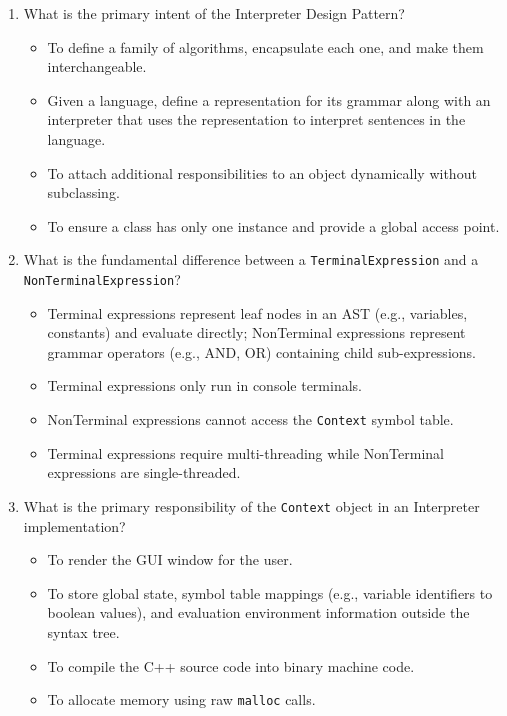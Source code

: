 \documentclass[12pt,a4paper]{article}
\begin{document}
\begin{enumerate}
    \item What is the primary intent of the Interpreter Design Pattern?
    \begin{itemize}
        \item[A)] To define a family of algorithms, encapsulate each one, and make them interchangeable.
        \item[B)] Given a language, define a representation for its grammar along with an interpreter that uses the representation to interpret sentences in the language.
        \item[C)] To attach additional responsibilities to an object dynamically without subclassing.
        \item[D)] To ensure a class has only one instance and provide a global access point.
    \end{itemize}

    \item What is the fundamental difference between a \texttt{TerminalExpression} and a \texttt{NonTerminalExpression}?
    \begin{itemize}
        \item[A)] Terminal expressions represent leaf nodes in an AST (e.g., variables, constants) and evaluate directly; NonTerminal expressions represent grammar operators (e.g., AND, OR) containing child sub-expressions.
        \item[B)] Terminal expressions only run in console terminals.
        \item[C)] NonTerminal expressions cannot access the \texttt{Context} symbol table.
        \item[D)] Terminal expressions require multi-threading while NonTerminal expressions are single-threaded.
    \end{itemize}

    \item What is the primary responsibility of the \texttt{Context} object in an Interpreter implementation?
    \begin{itemize}
        \item[A)] To render the GUI window for the user.
        \item[B)] To store global state, symbol table mappings (e.g., variable identifiers to boolean values), and evaluation environment information outside the syntax tree.
        \item[C)] To compile the C++ source code into binary machine code.
        \item[D)] To allocate memory using raw \texttt{malloc} calls.
    \end{itemize}


\end{enumerate}
\end{document}
